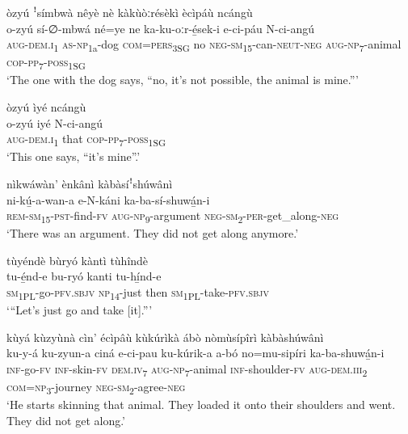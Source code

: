 òzyú ꜝsímbwà nêyè nè kàkùòːrésèkì ècìpáù ncángù\\
\gll o-zyú    sí-∅-mbwá  né=ye    ne  ka-ku-oːr-é̲sek-i e-ci-páu    N-ci-angú \\
\textsc{aug}{}-\textsc{dem}.\textsc{i}\textsubscript{1}  \textsc{as}{}-\textsc{np}\textsubscript{1a}{}-dog  \textsc{com}=\textsc{pers}\textsubscript{3SG}  no  \textsc{neg}{}-\textsc{sm}\textsubscript{15}{}-can-\textsc{neut}{}-\textsc{neg}
\textsc{aug}{}-\textsc{np}\textsubscript{7}{}-animal  \textsc{cop}{}-\textsc{pp}\textsubscript{7}{}-\textsc{poss}\textsubscript{1SG}\\
\glt ‘The one with the dog says, “no, it’s not possible, the animal is mine.”’\bigskip

òzyú ìyé ncángù\\
\gll o-zyú    iyé  N-ci-angú\\
\textsc{aug}{}-\textsc{dem}.\textsc{i}\textsubscript{1}  that  \textsc{cop}{}-\textsc{pp}\textsubscript{7}{}-\textsc{poss}\textsubscript{1SG} \\
\glt ‘This one says, “it’s mine”.’\bigskip

nìkwáwàn’ ènkânì kàbàsíꜝshúwânì\\
\gll ni-kú̲-a-wan-a    e-N-káni    ka-ba-sí-shuwá̲n-i\\
\textsc{rem}{}-\textsc{sm}\textsubscript{15}{}-\textsc{pst}{}-find-\textsc{fv}  \textsc{aug}{}-\textsc{np}\textsubscript{9}{}-argument  \textsc{neg}{}-\textsc{sm}\textsubscript{2}{}-\textsc{per}{}-get\_along-\textsc{neg}\\
\glt ‘There was an argument. They did not get along anymore.’\bigskip

tùyéndè bùryó kàntì tùhîndè\\
\gll tu-é̲nd-e    bu-ryó  kanti  tu-hí̲nd-e\\
\textsc{sm}\textsubscript{1PL}{}-go-\textsc{pfv}.\textsc{sbjv}  \textsc{np}\textsubscript{14}{}-just  then  \textsc{sm}\textsubscript{1PL\-}{}-take-\textsc{pfv}.\textsc{sbjv}\\
\glt ‘“Let’s just go and take [it].”’\bigskip

kùyá kùzyùnà cìn’ écìpâù kùkúrìkà ábò nòmùsípîrì kàbàshúwânì\\
\gll ku-y-á  ku-zyun-a  ciná    e-ci-pau ku-kúrik-a    a-bó    no=mu-sipíri    ka-ba-shuwá̲n-i \\
\textsc{inf}{}-go-\textsc{fv}  \textsc{inf}{}-skin-\textsc{fv}  \textsc{dem}.\textsc{iv}\textsubscript{7}  \textsc{aug}{}-\textsc{np}\textsubscript{7}{}-animal
\textsc{inf}{}-shoulder-\textsc{fv}  \textsc{aug}{}-\textsc{dem}.\textsc{iii}\textsubscript{2} \textsc{com}=\textsc{np}\textsubscript{3}{}-journey  \textsc{neg}{}-\textsc{sm}\textsubscript{2}{}-agree-\textsc{neg}\\
\glt ‘He starts skinning that animal. They loaded it onto their shoulders and went. They did not get along.’\bigskip

